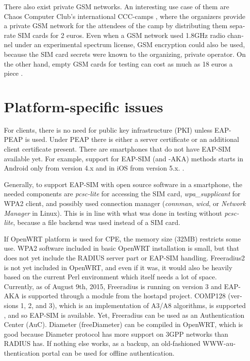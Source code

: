 \documentclass[12pt,a4paper,english]{tutthesis}
\begin{document}
\begin{otherlanguage}{english}
There also exist private GSM networks. An interesting use case
of them  are Chaos Computer Club's international 
CCC-camps \cite{ccc}, where the organizers 
provide a private GSM network for the attendees of the camp
by distributing them separate SIM cards for 2 euros.  Even when a GSM
network used 1.8GHz radio channel under an experimental spectrum
license,  GSM encryption could also be used, because the SIM card secrets were known
to the organizing, private operator.
On the other hand, empty GSM cards for testing can cost as much as 
18 euros a piece \cite{smartjac-testsim}.


\section{Platform-specific issues}
\label{sec-6-3}

\label{sec:pcsc}

For clients, there is no need for public key infrastructure (PKI)
unless EAP-PEAP is used. Under PEAP there is either a server
certificate or an additional client certificate present.  There are
smartphones that do not have EAP-SIM  available yet.  For example,
support for EAP-SIM (and -AKA) methods starts in Android only from
version 4.x and in iOS from version 5.x. \cite{sim-support}.

Generally, to support EAP-SIM  with open source software in 
a smartphone, the needed components are \emph{pcsc-lite} for accessing the SIM card, \emph{wpa\_supplicant} for
WPA2 client, and possibly used connection manager (\emph{connman},
\emph{wicd}, or \emph{Network Manager} in Linux). This is in line with what was done in testing without \emph{pcsc-lite},
because a file backend was used instead of a SIM card.




If OpenWRT platform is used for CPE, the memory size (32MB) restricts
some use.
WPA2 software included in basic OpenWRT installation is small,
but that does not yet include the RADIUS server part or EAP-SIM handling.
Freeradius2 is not yet included in OpenWRT, and even if it was, it would
also be heavily based  on the current Perl environment which itself needs a
lot of space.  Currently, as of August 9th, 2015, Freeradius is
running on version 3 and EAP-AKA is supported through a module from the
hostapd project.  COMP128 (versions 1, 2, and 3), which is
an implementation of A3/A8 algorithms, is supported \cite{freeradius2},
and so EAP-SIM is available.  Yet, Freeradius can be used as
an Authentication Center (AuC).  Diameter (freeDiameter) can be compiled
in OpenWRT, which is good because 
 Diameter protocol has more support on 3GPP networks 
than RADIUS has.  If nothing else works, as a backup,
an old-fashioned WWW-authentication portal can be used for offline
authentication.











\end{otherlanguage}
\end{document}
